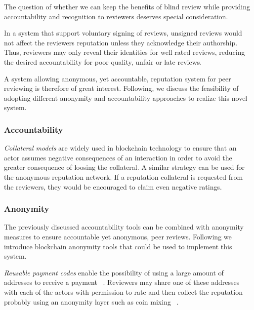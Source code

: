 The question of whether we can keep the benefits of blind review while providing
accountability and recognition to reviewers deserves special consideration.

In a system that support voluntary signing of reviews, unsigned reviews would
not affect the reviewers reputation unless they acknowledge their authorship.
Thus, reviewers may only reveal their identities for well rated reviews,
reducing the desired accountability for poor quality, unfair or late reviews.

A system allowing anonymous, yet accountable, reputation system for peer
reviewing is therefore of great interest. Following, we discuss the feasibility
of adopting different anonymity and accountability approaches to realize this
novel system.

\subsubsection*{Accountability}

\emph{Collateral models} are widely used in blockchain technology to ensure that
an actor assumes negative consequences of an interaction in order to avoid the
greater consequence of loosing the collateral. A similar strategy can be used
for the anonymous reputation network. If a reputation collateral is requested
from the reviewers, they would be encouraged to claim even negative ratings.

\subsubsection*{Anonymity}


The previously discussed accountability tools can be combined with anonymity
measures to ensure accountable yet anonymous, peer reviews. Following we
introduce blockchain anonymity tools that could be used to implement this
system.

\emph{Reusable payment codes} enable the possibility of using a large amount of
addresses to receive a payment ~\cite{harrigan2016unreasonable,
  ranvierReusable}. Reviewers may share one of these addresses with each of the
actors with permission to rate and then collect the reputation probably using an
anonymity layer such as coin mixing ~\cite{meiklejohn2015privacy}.

